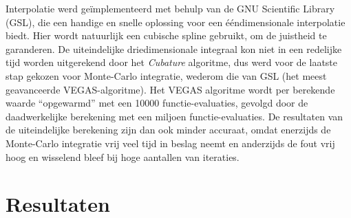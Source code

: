 \documentclass[a4paper,11pt]{article}
\numberwithin{equation}{section} %
\begin{document}
Interpolatie werd geïmplementeerd met behulp van de GNU Scientific Library (GSL), die een handige en snelle oplossing voor een ééndimensionale interpolatie biedt.
Hier wordt natuurlijk een cubische spline gebruikt, om de juistheid te garanderen.
De uiteindelijke driedimensionale integraal kon niet in een redelijke tijd worden uitgerekend door het \textit{Cubature} algoritme, dus werd voor de laatste stap gekozen voor Monte-Carlo integratie, wederom die van GSL (het meest geavanceerde VEGAS-algoritme).
Het VEGAS algoritme wordt per berekende waarde “opgewarmd” met een 10000 functie-evaluaties, gevolgd door de daadwerkelijke berekening met een miljoen functie-evaluaties.
De resultaten van de uiteindelijke berekening zijn dan ook minder accuraat, omdat enerzijds de Monte-Carlo integratie vrij veel tijd in beslag neemt en anderzijds de fout vrij hoog en wisselend bleef bij hoge aantallen van iteraties.

\section{Resultaten}
\end{document}
